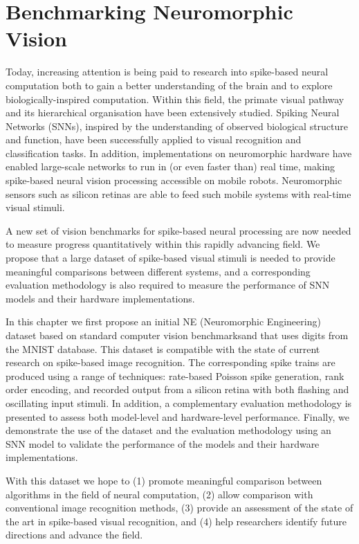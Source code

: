 \chapter{Benchmarking Neuromorphic Vision}
\label{cha:bench}

Today, increasing attention is being paid to research into spike-based neural computation both to gain a better understanding of the brain and to explore biologically-inspired computation.
Within this field, the primate visual pathway and its hierarchical organisation have been extensively studied.
Spiking Neural Networks (SNNs), inspired by the understanding of observed biological structure and function, have been successfully applied to visual recognition and classification tasks.
In addition, implementations on neuromorphic hardware have enabled large-scale networks to run in (or even faster than) real time, making spike-based neural vision processing accessible on mobile robots.
Neuromorphic sensors such as silicon retinas are able to feed such mobile systems with real-time visual stimuli.

A new set of vision benchmarks for spike-based neural processing are now needed to measure progress quantitatively within this rapidly advancing field.
We propose that a large dataset of spike-based visual stimuli is needed to provide meaningful comparisons between different systems, and a corresponding evaluation methodology is also required to measure the performance of SNN models and their hardware implementations.

In this chapter we first propose an initial NE (Neuromorphic Engineering) dataset based on standard computer vision benchmarksand that uses digits from the MNIST database.
This dataset is compatible with the state of current research on spike-based image recognition.
The corresponding spike trains are produced using a range of techniques: rate-based Poisson spike generation, rank order encoding, and recorded output from a silicon retina with both flashing and oscillating input stimuli.
In addition, a complementary evaluation methodology is presented to assess both model-level and hardware-level performance.
Finally, we demonstrate the use of the dataset and the evaluation methodology using an SNN model to validate the performance of the models and their hardware implementations.

With this dataset we hope to (1) promote meaningful comparison between algorithms in the field of neural computation, (2) allow comparison with conventional image recognition methods, (3) provide an assessment of the state of the art in spike-based visual recognition, and (4) help researchers identify future directions and advance the field.

